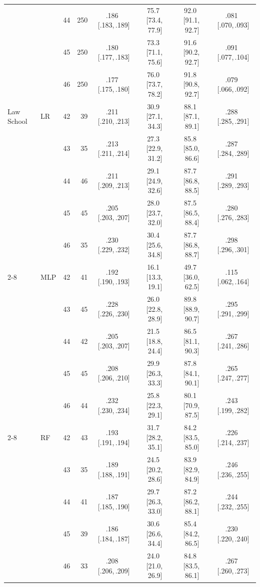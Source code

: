 \begin{table}[t]
\begin{tabular}{llrr cccc}
 &  & 44 & 250 & .186 \,[.183,\,.189] & 75.7 \,[73.4,\,77.9] & 92.0 \,[91.1,\,92.7] & .081 \,[.070,\,.093] \\
 &  & 45 & 250 & .180 \,[.177,\,.183] & 73.3 \,[71.1,\,75.6] & 91.6 \,[90.2,\,92.7] & .091 \,[.077,\,.104] \\
 &  & 46 & 250 & .177 \,[.175,\,.180] & 76.0 \,[73.7,\,78.2] & 91.8 \,[90.8,\,92.7] & .079 \,[.066,\,.092] \\
\hline
Law School & LR & 42 & 39 & .211 \,[.210,\,.213] & 30.9 \,[27.1,\,34.3] & 88.1 \,[87.1,\,89.1] & .288 \,[.285,\,.291] \\
 &  & 43 & 35 & .213 \,[.211,\,.214] & 27.3 \,[22.9,\,31.2] & 85.8 \,[85.0,\,86.6] & .287 \,[.284,\,.289] \\
 &  & 44 & 46 & .211 \,[.209,\,.213] & 29.1 \,[24.9,\,32.6] & 87.7 \,[86.8,\,88.5] & .291 \,[.289,\,.293] \\
 &  & 45 & 45 & .205 \,[.203,\,.207] & 28.0 \,[23.7,\,32.0] & 87.5 \,[86.5,\,88.4] & .280 \,[.276,\,.283] \\
 &  & 46 & 35 & .230 \,[.229,\,.232] & 30.4 \,[25.6,\,34.8] & 87.7 \,[86.8,\,88.7] & .298 \,[.296,\,.301] \\
\cline{2-8}
 & MLP & 42 & 41 & .192 \,[.190,\,.193] & 16.1 \,[13.3,\,19.1] & 49.7 \,[36.0,\,62.5] & .115 \,[.062,\,.164] \\
 &  & 43 & 45 & .228 \,[.226,\,.230] & 26.0 \,[22.8,\,28.9] & 89.8 \,[88.9,\,90.7] & .295 \,[.291,\,.299] \\
 &  & 44 & 42 & .205 \,[.203,\,.207] & 21.5 \,[18.8,\,24.4] & 86.5 \,[81.1,\,90.3] & .267 \,[.241,\,.286] \\
 &  & 45 & 45 & .208 \,[.206,\,.210] & 29.9 \,[26.3,\,33.3] & 87.8 \,[84.1,\,90.1] & .265 \,[.247,\,.277] \\
 &  & 46 & 44 & .232 \,[.230,\,.234] & 25.8 \,[22.3,\,29.1] & 80.1 \,[70.9,\,87.5] & .243 \,[.199,\,.282] \\
\cline{2-8}
 & RF & 42 & 43 & .193 \,[.191,\,.194] & 31.7 \,[28.2,\,35.1] & 84.2 \,[83.5,\,85.0] & .226 \,[.214,\,.237] \\
 &  & 43 & 35 & .189 \,[.188,\,.191] & 24.5 \,[20.2,\,28.6] & 83.9 \,[82.9,\,84.9] & .246 \,[.236,\,.255] \\
 &  & 44 & 41 & .187 \,[.185,\,.190] & 29.7 \,[26.3,\,33.0] & 87.2 \,[86.2,\,88.1] & .244 \,[.232,\,.255] \\
 &  & 45 & 39 & .186 \,[.184,\,.187] & 30.6 \,[26.6,\,34.4] & 85.4 \,[84.2,\,86.5] & .230 \,[.220,\,.240] \\
 &  & 46 & 33 & .208 \,[.206,\,.209] & 24.0 \,[21.0,\,26.9] & 84.8 \,[83.5,\,86.1] & .267 \,[.260,\,.273] \\
\hline
\end{tabular}
\end{table}

